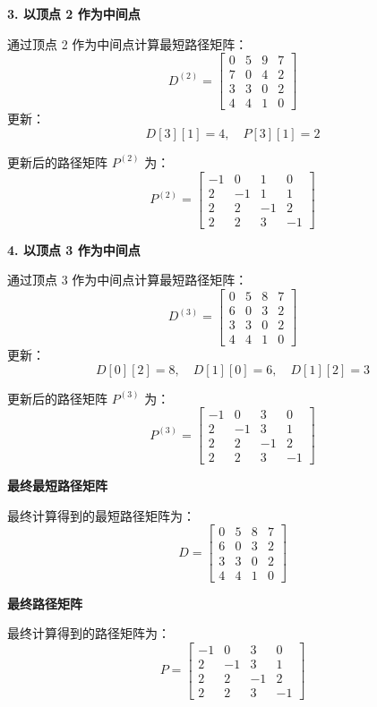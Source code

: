 \documentclass[lang=cn,newtx,10pt,scheme=chinese]{../elegantbook}
\begin{document}
\textbf{3. 以顶点 2 作为中间点}

通过顶点 2 作为中间点计算最短路径矩阵：
\[
D^{(2)} =
\begin{bmatrix}
0 & 5 & 9 & 7 \\
7 & 0 & 4 & 2 \\
3 & 3 & 0 & 2 \\
4 & 4 & 1 & 0
\end{bmatrix}
\]
更新：
\[
D[3][1] = 4, \quad P[3][1] = 2
\]

更新后的路径矩阵 \( P^{(2)} \) 为：
\[
P^{(2)} =
\begin{bmatrix}
-1 & 0 & 1 & 0 \\
2 & -1 & 1 & 1 \\
2 & 2 & -1 & 2 \\
2 & 2 & 3 & -1
\end{bmatrix}
\]

\textbf{4. 以顶点 3 作为中间点}

通过顶点 3 作为中间点计算最短路径矩阵：
\[
D^{(3)} =
\begin{bmatrix}
0 & 5 & 8 & 7 \\
6 & 0 & 3 & 2 \\
3 & 3 & 0 & 2 \\
4 & 4 & 1 & 0
\end{bmatrix}
\]
更新：
\[
D[0][2] = 8, \quad D[1][0] = 6, \quad D[1][2] = 3
\]

更新后的路径矩阵 \( P^{(3)} \) 为：
\[
P^{(3)} =
\begin{bmatrix}
-1 & 0 & 3 & 0 \\
2 & -1 & 3 & 1 \\
2 & 2 & -1 & 2 \\
2 & 2 & 3 & -1
\end{bmatrix}
\]

\textbf{最终最短路径矩阵}

最终计算得到的最短路径矩阵为：
\[
D =
\begin{bmatrix}
0 & 5 & 8 & 7 \\
6 & 0 & 3 & 2 \\
3 & 3 & 0 & 2 \\
4 & 4 & 1 & 0
\end{bmatrix}
\]

\textbf{最终路径矩阵}

最终计算得到的路径矩阵为：
\[
P =
\begin{bmatrix}
-1 & 0 & 3 & 0 \\
2 & -1 & 3 & 1 \\
2 & 2 & -1 & 2 \\
2 & 2 & 3 & -1
\end{bmatrix}
\]
\end{document}
